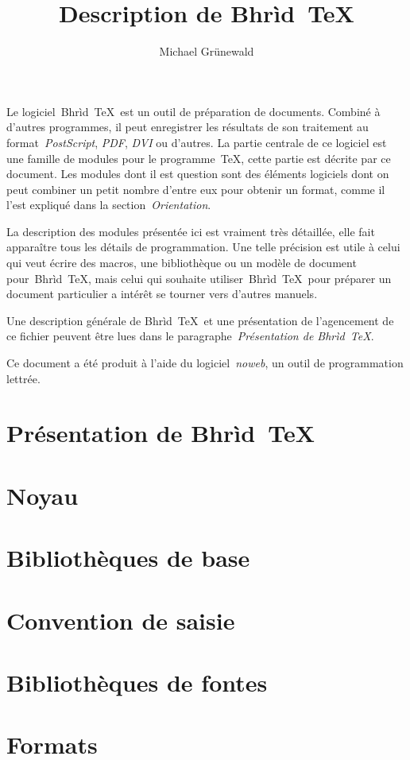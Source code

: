\documentclass{shpaper}
\title{Description de Bhrìd~\TeX}
\author{Michael Grünewald}
\newcommand\brTeX{Bhrìd~\TeX}
\begin{document}
Le logiciel~\brTeX\ est un outil de préparation de documents. Combiné
à d'autres programmes, il peut enregistrer les résultats de son
traitement au format~\emph{PostScript}, \emph{PDF}, \emph{DVI} ou
d'autres. La partie centrale de ce logiciel est une famille de modules
pour le programme~\TeX, cette partie est décrite par ce document. Les
modules dont il est question sont des éléments logiciels dont on peut
combiner un petit nombre d'entre eux pour obtenir un format, comme il
l'est expliqué dans la section~\emph{Orientation}.

La description des modules présentée ici est vraiment très détaillée,
elle fait apparaître tous les détails de programmation. Une telle
précision est utile à celui qui veut écrire des macros, une
bibliothèque ou un modèle de document pour~\brTeX, mais celui qui
souhaite utiliser~\brTeX\ pour préparer un document particulier
a intérêt se tourner vers d'autres manuels.

Une description générale de \brTeX\ et une présentation de
l'agencement de ce fichier peuvent être lues dans le
paragraphe~\emph{Présentation de \brTeX}.

Ce document a été produit à l'aide du logiciel~\emph{noweb}, un outil
de programmation lettrée.

\tableofcontents
\part{Présentation de \brTeX}

\part{Noyau}


\part{Bibliothèques de base}






\part{Convention de saisie}





\part{Bibliothèques de fontes}







\part{Formats}





\end{document}
